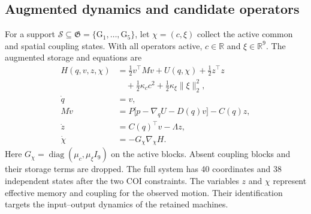 \documentclass[journal]{IEEEtran}
\DeclareMathOperator{\diag}{diag}
\newcommand{\op}[1]{\ensuremath{\mathrm{G}_{#1}}}
\begin{document}
\subsection{Augmented dynamics and candidate operators}
For a support \(\mathcal S\subseteq\mathfrak G=\{\op{1},\ldots,\op{5}\}\),
let \(\chi=(c,\xi)\) collect the active common and spatial coupling states.
With all operators active, \(c\in\mathbb R\) and \(\xi\in\mathbb R^9\).
The augmented storage and equations are
\begin{align}
 H(q,v,z,\chi)&=\tfrac12 v^\top M v+U(q,\chi)+\tfrac12 z^\top z\nonumber\\
      &\quad+\tfrac12\kappa_c c^2+\tfrac12\kappa_\xi\|\xi\|_2^2,
      \label{eq:storage}\\
 \dot q&=v,\nonumber\\
 M\dot v&=P\bigl[p-\nabla_q U-D(q)v\bigr]-C(q)z,\nonumber\\
 \dot z&=C(q)^\top v-\Lambda z,\nonumber\\
 \dot\chi&=-G_\chi\nabla_\chi H. \label{eq:mother}
\end{align}
Here \(G_\chi=\diag(\mu_c,\mu_\xi I_9)\) on the active blocks.
Absent coupling blocks and their storage terms are dropped. The full system
has 40 coordinates and 38 independent states after the two COI constraints.
The variables \(z\) and \(\chi\) represent effective memory and coupling for
the observed motion. Their identification targets the input--output dynamics
of the retained machines.
\end{document}
